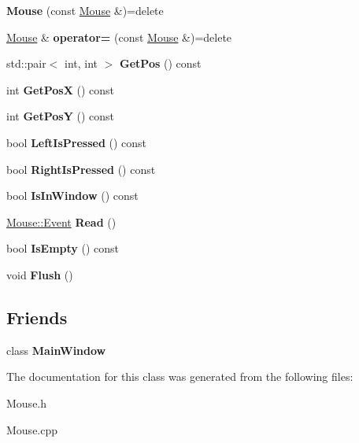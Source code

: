 \begin{DoxyCompactItemize}
\item 
\mbox{\label{class_mouse_a589f01769018752ebb09b4065892d2ba}} 
{\bfseries Mouse} (const \hyperlink{class_mouse}{Mouse} \&)=delete
\item 
\mbox{\label{class_mouse_a819e86107c42969fbd14511ce7b30898}} 
\hyperlink{class_mouse}{Mouse} \& {\bfseries operator=} (const \hyperlink{class_mouse}{Mouse} \&)=delete
\item 
\mbox{\label{class_mouse_abc884bba293fe55e3069b21b7c1d78ac}} 
std\+::pair$<$ int, int $>$ {\bfseries Get\+Pos} () const
\item 
\mbox{\label{class_mouse_ac80c44d9454043b9f41a636886396e4a}} 
int {\bfseries Get\+PosX} () const
\item 
\mbox{\label{class_mouse_ada9ba37672842e0968252ae9dd737891}} 
int {\bfseries Get\+PosY} () const
\item 
\mbox{\label{class_mouse_a368d450d32e6577d13c49782ca1dd9a7}} 
bool {\bfseries Left\+Is\+Pressed} () const
\item 
\mbox{\label{class_mouse_afc3a95d7c88453a34ee9747dcd2057b0}} 
bool {\bfseries Right\+Is\+Pressed} () const
\item 
\mbox{\label{class_mouse_aac019d97e3890d863b26ed9eff1e3588}} 
bool {\bfseries Is\+In\+Window} () const
\item 
\mbox{\label{class_mouse_a4871a2637c79bfedb316f7f66e939baf}} 
\hyperlink{class_mouse_1_1_event}{Mouse\+::\+Event} {\bfseries Read} ()
\item 
\mbox{\label{class_mouse_ae331dd2ea0826da1e1e0daa081841369}} 
bool {\bfseries Is\+Empty} () const
\item 
\mbox{\label{class_mouse_a240cd0d00a0aa4a57ceafeec058b256d}} 
void {\bfseries Flush} ()
\end{DoxyCompactItemize}
\subsection*{Friends}
\begin{DoxyCompactItemize}
\item 
\mbox{\label{class_mouse_af9db4b672c4d3104f5541893e08e1809}} 
class {\bfseries Main\+Window}
\end{DoxyCompactItemize}


The documentation for this class was generated from the following files\+:\begin{DoxyCompactItemize}
\item 
Mouse.\+h\item 
Mouse.\+cpp\end{DoxyCompactItemize}
